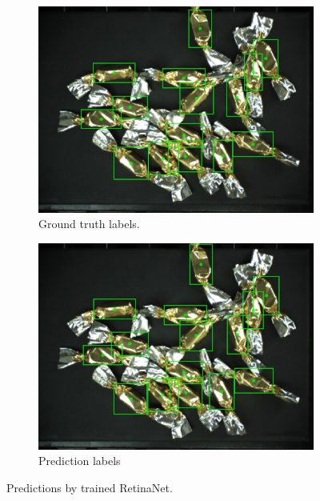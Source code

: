 \begin{figure}[H]
\begin{subfigure}{0.5\textwidth}
  \end{subfigure}
  \begin{subfigure}{0.5\textwidth}
    \centering
    \includegraphics[width=\linewidth]{Sources/Figures/appendix/actual_122.jpg}
    \caption{Ground truth labels.}

  \end{subfigure}
  \begin{subfigure}{0.5\textwidth}
    \centering
    \includegraphics[width=\linewidth]{Sources/Figures/appendix/pred_122.jpg}
    \caption{Prediction labels}

  \end{subfigure}
  \caption{Predictions by trained RetinaNet.}
  \label{fig:candies_appendix2}
\end{figure}